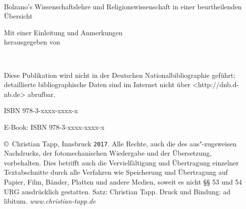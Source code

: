 \pagestyle{completelyempty}%
\cleardoublepage
\begin{center}
\newlength{\titeldehnung}\setlength{\titeldehnung}{0.8ex}
\def\sperrfaktor{1.2}
\\
\LARGE Bolzano's Wissenschaftslehre und Religionswissenschaft in einer beurtheilenden Übersicht \par\vspace{12mm}
\normalsize Mit einer Einleitung und Anmerkungen \\[\titeldehnung]
herausgegeben von \\[\titeldehnung]
\par\vfill
{}\\[\titeldehnung]
\par
\end{center}
\newpage
\begin{center}
\par\vfill
\end{center}
\footnotesize\mbox{}\par
\begin{minipage}{77mm}
\noindent Diese Publikation wird nicht in der Deutschen Nationalbibliographie geführt; detaillierte bibliographische Daten sind im Internet nicht über <http://dnb.d-nb.de> abrufbar.\par
ISBN 978-3-xxxx-xxxx-x\par
E-Book: ISBN 978-3-xxxx-xxxx-x\par\vspace{12mm}
\copyright\ Christian Tapp, Innsbruck \texttt{2017}. Alle Rechte, auch die des aus"-zugsweisen Nachdrucks, der fotomechanischen Wiedergabe und der Übersetzung, vorbehalten. Dies betrifft auch die Vervielfältigung und Übertragung einzelner Textabschnitte durch alle Verfahren wie Speicherung und Übertragung auf Papier, Film, Bänder, Platten und andere Medien, soweit es nicht §§ 53 und 54 URG ausdrücklich gestatten. Satz: Christian Tapp. Druck und Bindung: ad libitum. \hfill \textit{www.christian-tapp.de}\par
\end{minipage}
\newpage
\endinput